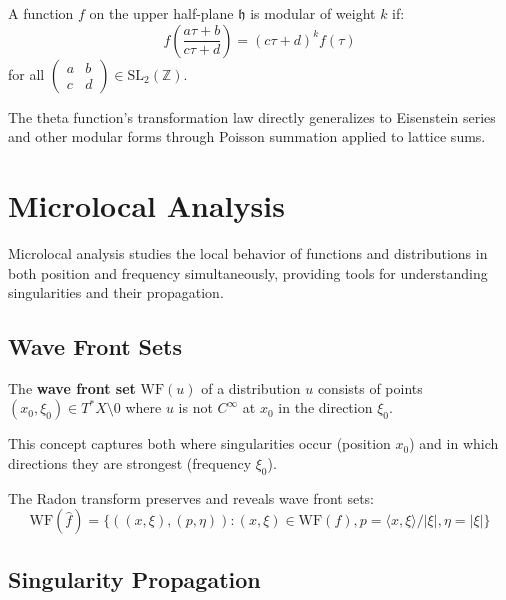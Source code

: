 \begin{definition}
A function $f$ on the upper half-plane $\mathfrak{h}$ is modular of weight $k$ if:
$$f\left(\frac{a\tau + b}{c\tau + d}\right) = (c\tau + d)^k f(\tau)$$
for all $\begin{pmatrix} a & b \\ c & d \end{pmatrix} \in \text{SL}_2(\mathbb{Z})$.
\end{definition}

The theta function's transformation law directly generalizes to Eisenstein series and other modular forms through Poisson summation applied to lattice sums.

\section{Microlocal Analysis}
\label{sec:microlocal-analysis}

Microlocal analysis studies the local behavior of functions and distributions in both position and frequency simultaneously, providing tools for understanding singularities and their propagation.

\subsection{Wave Front Sets}

\begin{definition}
The \textbf{wave front set} $\text{WF}(u)$ of a distribution $u$ consists of points $(x_0, \xi_0) \in T^*X \setminus 0$ where $u$ is not $C^{\infty}$ at $x_0$ in the direction $\xi_0$.
\end{definition}

This concept captures both where singularities occur (position $x_0$) and in which directions they are strongest (frequency $\xi_0$).

\begin{theorem}
The Radon transform preserves and reveals wave front sets:
$$\text{WF}(\hat{f}) = \{((x,\xi), (p,\eta)) : (x,\xi) \in \text{WF}(f), p = \langle x,\xi \rangle/|\xi|, \eta = |\xi|\}$$
\end{theorem}

\subsection{Singularity Propagation}

